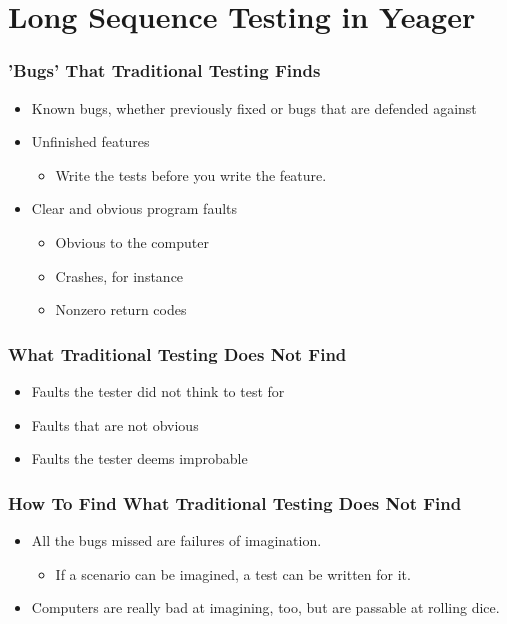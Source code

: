 \section{Long Sequence Testing in Yeager}

\begin{frame}
  \frametitle{'Bugs' That Traditional Testing Finds}
  \begin{itemize}
    \item Known bugs, whether previously fixed or bugs that are defended against
    \item Unfinished features
    \begin{itemize}
      \item Write the tests before you write the feature.
    \end{itemize}
    \item Clear and obvious program faults
    \begin{itemize}
      \item Obvious to the computer
      \item Crashes, for instance
      \item Nonzero return codes
    \end{itemize}
  \end{itemize}
\end{frame}

\begin{frame}
  \frametitle{What Traditional Testing Does Not Find}
  \begin{itemize}
    \item Faults the tester did not think to test for
    \item Faults that are not obvious
    \item Faults the tester deems improbable
  \end{itemize}
\end{frame}

\begin{frame}
  \frametitle{How To Find What Traditional Testing Does Not Find}
  \begin{itemize}
    \item All the bugs missed are failures of imagination.
    \begin{itemize}
      \item If a scenario can be imagined, a test can be written for it.
    \end{itemize}
    \item Computers are really bad at imagining, too, but are passable at rolling dice.
  \end{itemize}
\end{frame}

